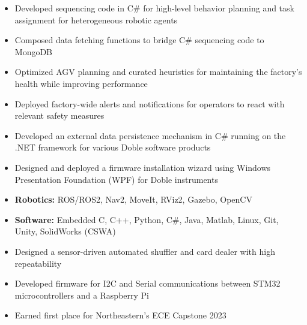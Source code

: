 \documentclass[10pt,a4paper,ragged2e,withhyper]{altacv}
\begin{document}
    \begin{itemize}
        \item Developed sequencing code in C\# for high-level behavior planning and task assignment for heterogeneous robotic agents
        \item Composed data fetching functions to bridge C\# sequencing code to MongoDB
        \item Optimized AGV planning and curated heuristics for maintaining the factory's health while improving performance
        \item Deployed factory-wide alerts and notifications for operators to react with relevant safety measures
    \end{itemize}
    \begin{itemize}
        \item Developed an external data persistence mechanism in C\# running on the .NET framework for various Doble software products
        \item Designed and deployed a firmware installation wizard using Windows Presentation Foundation (WPF) for Doble instruments
    \end{itemize}
    \vspace{-1.55em}
    \begin{itemize}
        \item[] \textbf{Robotics:} ROS/ROS2, Nav2, MoveIt, RViz2, Gazebo, OpenCV
        \item[] \textbf{Software:} Embedded C, C++, Python, C\#, Java, Matlab, Linux, Git, Unity, SolidWorks (CSWA)
    \end{itemize}
    \vspace{-1.45em}
    \begin{itemize}
        \item Designed a sensor-driven automated shuffler and card dealer with high repeatability
        \item Developed firmware for I2C and Serial communications between STM32 microcontrollers and a Raspberry Pi
        \item Earned first place for Northeastern's ECE Capstone 2023
    \end{itemize}
\end{document}
